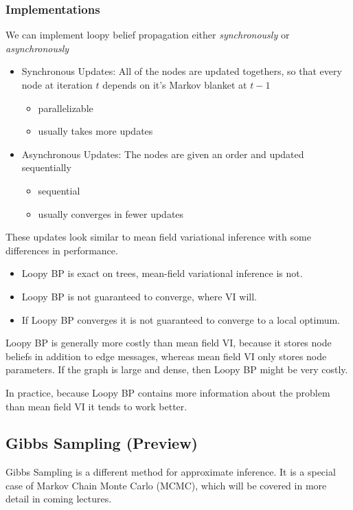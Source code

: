 \documentclass{article}
\begin{document}
\subsubsection{Implementations}
We can implement loopy belief propagation either \emph{synchronously} or \emph{asynchronously}
\begin{itemize}
	\item Synchronous Updates: All of the nodes are updated togethers, so that every node at iteration $t$ depends on it's Markov blanket at $t-1$
	\begin{itemize}
		\item parallelizable
		\item usually takes more updates
	\end{itemize}
	\item Asynchronous Updates: The nodes are given an order and updated sequentially
	\begin{itemize}
		\item sequential
		\item usually converges in fewer updates
	\end{itemize}
\end{itemize}

These updates look similar to mean field variational inference with some differences in performance.
\begin{itemize}
	\item Loopy BP is exact on trees, mean-field variational inference is not.
	\item Loopy BP is not guaranteed to converge, where VI will.
	\item If Loopy BP converges it is not guaranteed to converge to a local optimum.
\end{itemize}
Loopy BP is generally more costly than mean field VI, because it stores node beliefs in addition to edge messages, whereas mean field VI only stores node parameters. If the graph is large and dense, then Loopy BP might be very costly. 

In practice, because Loopy BP contains more information about the problem than mean field VI it tends to work better.

\subsection{Gibbs Sampling (Preview)}

Gibbs Sampling is a different method for approximate inference. It is a special case of Markov Chain Monte Carlo (MCMC), which will be covered in more detail in coming lectures. 
\end{document}
